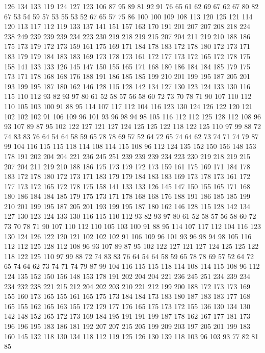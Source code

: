 126 134 133 119 124 127 123 106 87 95 89 81 92 91 76 65 61 62 69 67
62 67 80 82 67 53 54 59 57 53 55 53 52 67 65 57 75 86 100 100
109 108 113 120 125 121 114 120 113 117 112 119 133 137 141 151 157 163 170 191
201 207 207 208 218 224 238 249 239 239 239 234 223 230 219 218 219 215 207 204
211 219 210 188 186 175 173 179 172 173 159 161 175 169 171 184 178 183 172 178
180 172 173 171 183 179 179 184 183 183 169 173 178 173 161 172 177 173 172 165
172 178 175 158 141 133 133 126 145 147 150 155 165 171 168 180 186 184 184 185
179 175 173 171 178 168 168 176 188 191 186 185 185 199 210 201 199 195 187 205
201 193 199 195 187 180 162 146 128 115 128 142 134 127 130 123 124 133 130 116
115 110 112 93 82 93 97 80 61 52 58 57 56 58 60 72 73 70 78 71
90 107 110 112 110 105 103 100 91 88 95 114 107 117 112 104 116 123 130 124
126 122 120 121 102 102 102 91 106 109 96 101 93 96 98 94 98 105 116 112
112 125 128 112 108 96 93 107 89 87 95 102 122 127 121 127 124 125 125 122
118 122 125 110 97 99 88 72 74 83 83 76 64 54 64 58 59 65 78 78
69 57 52 64 72 65 74 64 62 73 74 71 74 79 87 99 104 116 115 115
118 114 108 114 115 108 96 112 124 135 152 150 156 148 153 178 191 202 204 204
221 236 245 251 239 239 239 234 223 230 219 218 219 215 207 204 211 219 210 188
186 175 173 179 172 173 159 161 175 169 171 184 178 183 172 178 180 172 173 171
183 179 179 184 183 183 169 173 178 173 161 172 177 173 172 165 172 178 175 158
141 133 133 126 145 147 150 155 165 171 168 180 186 184 184 185 179 175 173 171
178 168 168 176 188 191 186 185 185 199 210 201 199 195 187 205 201 193 199 195
187 180 162 146 128 115 128 142 134 127 130 123 124 133 130 116 115 110 112 93
82 93 97 80 61 52 58 57 56 58 60 72 73 70 78 71 90 107 110 112
110 105 103 100 91 88 95 114 107 117 112 104 116 123 130 124 126 122 120 121
102 102 102 91 106 109 96 101 93 96 98 94 98 105 116 112 112 125 128 112
108 96 93 107 89 87 95 102 122 127 121 127 124 125 125 122 118 122 125 110
97 99 88 72 74 83 83 76 64 54 64 58 59 65 78 78 69 57 52 64
72 65 74 64 62 73 74 71 74 79 87 99 104 116 115 115 118 114 108 114
115 108 96 112 124 135 152 150 156 148 153 178 191 202 204 204 221 236 245 251
234 239 234 234 232 238 221 215 212 204 202 203 210 221 212 199 200 188 172 173
173 169 155 160 173 165 155 161 165 175 173 184 184 173 183 180 187 183 183 177
168 165 155 162 165 163 155 172 179 177 176 165 175 173 172 155 136 130 134 130
142 148 152 165 172 173 169 184 195 191 191 199 187 178 162 167 177 181 173 196
196 195 183 186 181 192 207 207 215 205 199 209 203 197 205 201 199 183 160 145
132 118 130 134 118 112 119 125 126 130 139 118 103 96 103 93 77 82 81 85
